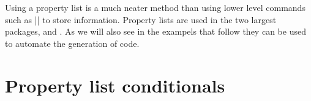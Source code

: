 Using a property list is a much neater method than using lower level commands such as
|\csname| to store information. Property lists are used in the two largest  packages,  and . As we will also see in the exampels that 
follow they can be used to automate the generation of code.


\section{Property list conditionals}







